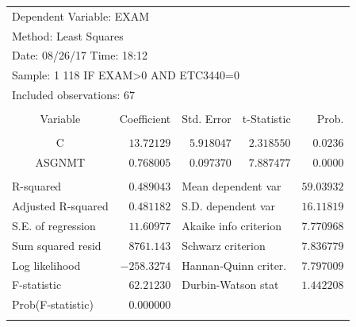 \documentclass[12pt]{report}
\begin{document}
\begin{table}[H]
	\centering
	\begin{tabular}{lrrrr}
		\multicolumn{3}{l}{Dependent Variable: EXAM}&\multicolumn{1}{c}{}&\multicolumn{1}{c}{}\\
		\multicolumn{3}{l}{Method: Least Squares}&\multicolumn{1}{c}{}&\multicolumn{1}{c}{}\\
		\multicolumn{3}{l}{Date: 08/26/17   Time: 18:12}&\multicolumn{1}{c}{}&\multicolumn{1}{c}{}\\
		\multicolumn{4}{l}{Sample: 1 118 IF EXAM\textgreater 0 AND ETC3440=0}&\multicolumn{1}{c}{}\\
		\multicolumn{3}{l}{Included observations: 67}&\multicolumn{1}{c}{}&\multicolumn{1}{c}{}\\
		[4.5pt] \hline \\ [-4.5pt]
		\multicolumn{1}{c}{Variable}&\multicolumn{1}{r}{Coefficient}&\multicolumn{1}{r}{Std. Error}&\multicolumn{1}{r}{t-Statistic}&\multicolumn{1}{r}{Prob.}\\
		[4.5pt] \hline \\ [-4.5pt]
		\multicolumn{1}{c}{C}&\multicolumn{1}{r}{$13.72129$}&\multicolumn{1}{r}{$5.918047$}&\multicolumn{1}{r}{$2.318550$}&\multicolumn{1}{r}{$0.0236$}\\
		\multicolumn{1}{c}{ASGNMT}&\multicolumn{1}{r}{$0.768005$}&\multicolumn{1}{r}{$0.097370$}&\multicolumn{1}{r}{$7.887477$}&\multicolumn{1}{r}{$0.0000$}\\
		[4.5pt] \hline \\ [-4.5pt]
		\multicolumn{1}{l}{R-squared}&\multicolumn{1}{r}{$0.489043$}&\multicolumn{2}{l}{Mean dependent var}&\multicolumn{1}{r}{$59.03932$}\\
		\multicolumn{1}{l}{Adjusted R-squared}&\multicolumn{1}{r}{$0.481182$}&\multicolumn{2}{l}{S.D. dependent var}&\multicolumn{1}{r}{$16.11819$}\\
		\multicolumn{1}{l}{S.E. of regression}&\multicolumn{1}{r}{$11.60977$}&\multicolumn{2}{l}{Akaike info criterion}&\multicolumn{1}{r}{$7.770968$}\\
		\multicolumn{1}{l}{Sum squared resid}&\multicolumn{1}{r}{$8761.143$}&\multicolumn{2}{l}{Schwarz criterion}&\multicolumn{1}{r}{$7.836779$}\\
		\multicolumn{1}{l}{Log likelihood}&\multicolumn{1}{r}{$-258.3274$}&\multicolumn{2}{l}{Hannan-Quinn criter.}&\multicolumn{1}{r}{$7.797009$}\\
		\multicolumn{1}{l}{F-statistic}&\multicolumn{1}{r}{$62.21230$}&\multicolumn{2}{l}{Durbin-Watson stat}&\multicolumn{1}{r}{$1.442208$}\\
		\multicolumn{1}{l}{Prob(F-statistic)}&\multicolumn{1}{r}{$0.000000$}&\multicolumn{1}{c}{}&\multicolumn{1}{c}{}&\multicolumn{1}{c}{}\\
		[4.5pt] \hline \\ [-4.5pt]
	\end{tabular}
\end{table}
\end{document}
